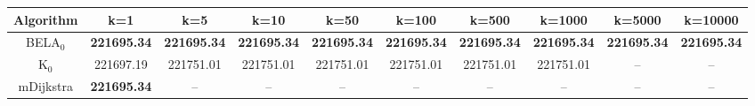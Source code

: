 \begin{tabular}{c|ccccccccc}\toprule
Algorithm & k=1 & k=5 & k=10 & k=50 & k=100 & k=500 & k=1000 & k=5000 & k=10000 \\ \midrule
BELA$_0$ & \textbf{221695.34} & \textbf{221695.34} & \textbf{221695.34} & \textbf{221695.34} & \textbf{221695.34} & \textbf{221695.34} & \textbf{221695.34} & \textbf{221695.34} & \textbf{221695.34} \\
K$_0$ & 221697.19 & 221751.01 & 221751.01 & 221751.01 & 221751.01 & 221751.01 & 221751.01 & -- & -- \\
mDijkstra & \textbf{221695.34} & -- & -- & -- & -- & -- & -- & -- & -- \\ \bottomrule 
\end{tabular}
